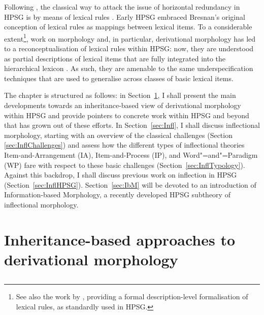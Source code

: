 \documentclass[output=paper,biblatex,babelshorthands,newtxmath,draftmode,colorlinks,citecolor=brown]{langscibook}
\begin{document}
Following \citet{Bresnan82}, the classical way to attack the issue of
horizontal redundancy in HPSG is by means of lexical rules
\citep{Flickinger87}. Early HPSG embraced Bresnan's original
conception of lexical rules as mappings between lexical items. To a
considerable extent\footnote{See also the work by
  \citet{Meurers02}, providing a formal
  description-level formalisation of lexical rules, as standardly used
  in HPSG.}, work on morphology and, in particular, derivational
morphology has led to a reconceptualisation of lexical rules within
HPSG: now, they are understood as partial descriptions of lexical
items that are fully integrated into the hierarchical lexicon
\citep{Koenig99}. As such, they are
amenable to the same underspecification techniques that are used to
generalise across classes of basic lexical items.



\medskip

The chapter is structured as follows: in Section~\ref{sec:Deriv}, I
shall present the main developments towards an inheritance-based view
of derivational morphology within HPSG and provide pointers to
concrete work within HPSG and beyond that has grown out of these
efforts. In Section~\ref{sec:Infl}, I shall discuss inflectional
morphology, starting with an overview of the classical challenges
(Section \ref{sec:InflChallenges}) and assess how the different types
of inflectional theories \emdash Item-and-Arrangement (IA),
Item-and-Process (IP), and Word"=and"=Paradigm (WP) \emdash fare with
respect to these basic challenges
(Section~\ref{sec:InflTypology}). Against this backdrop, I shall
discuss previous work on inflection in HPSG
(Section~\ref{sec:InflHPSG}). Section~\ref{sec:IbM} will be devoted to
an introduction of Information-based Morphology, a recently developed
HPSG subtheory of inflectional morphology.



\section{Inheritance-based approaches to derivational morphology}
\label{sec:Deriv}\label{sec:derivational-morphology}

\subsection{\texorpdfstring{\citet{Krieger:Nerbonne:93}}{Krieger \& Nerbonne (1993)}}
\end{document}
